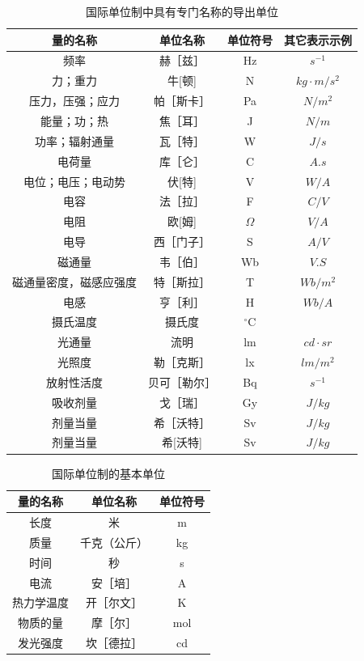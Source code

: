 \begin{table}
	\centering
	\song\wuhao
	\caption{国际单位制中具有专门名称的导出单位}
	\begin{tabular}{cccc}
	\hline
	量的名称&单位名称&单位符号&其它表示示例\\
	\hline
	频率&赫［兹］&Hz&$s^{-1}$\\
	力；重力&牛[顿]&N&$kg·m/s^2$\\
	压力，压强；应力&帕［斯卡］&Pa&$N/m^2$\\
	能量；功；热&焦［耳］&J&$N/m$\\
	功率；辐射通量&瓦［特］&W&$J/s$\\
	电荷量&库［仑］&C&$A.s$\\
	电位；电压；电动势&伏[特]&V&$W/A$\\
	电容&法［拉］&F&$C/V$\\
	电阻&欧[姆]&$\Omega$&$V/A$\\
	电导&西［门子］&S&$A/V$\\
	磁通量&韦［伯］&Wb&$V.S$\\
	磁通量密度，磁感应强度&特［斯拉］&T&$Wb/m^2$\\
	电感&亨［利］&H&$Wb/A$\\
	摄氏温度&摄氏度&$^\circ$C&~\\
	光通量&流明&lm&$cd·sr$\\
	光照度&勒［克斯］&lx&$lm/m^2$\\
	放射性活度&贝可［勒尔］&Bq&$s^{-1}$\\
	吸收剂量&戈［瑞］&Gy&$J/kg$\\
	剂量当量&希［沃特］&Sv&$J/kg$\\
	\hline
	剂量当量&希[沃特]&Sv&$J/kg$\\
	\hline
	\end{tabular}
\end{table}

\begin{table}
	\centering
	\song\wuhao
	\caption{国际单位制的基本单位}
	\begin{tabular}{ccc}
	\hline
	量的名称&单位名称&单位符号\\
	\hline
	长度&米&m\\
	质量&千克（公斤）&kg\\
	时间&秒&s\\
	电流&安［培］&A\\
	热力学温度&开［尔文］&K\\
	物质的量&摩［尔］&mol\\
	发光强度&坎［德拉］&cd\\
	\hline
	\end{tabular}
\end{table}


